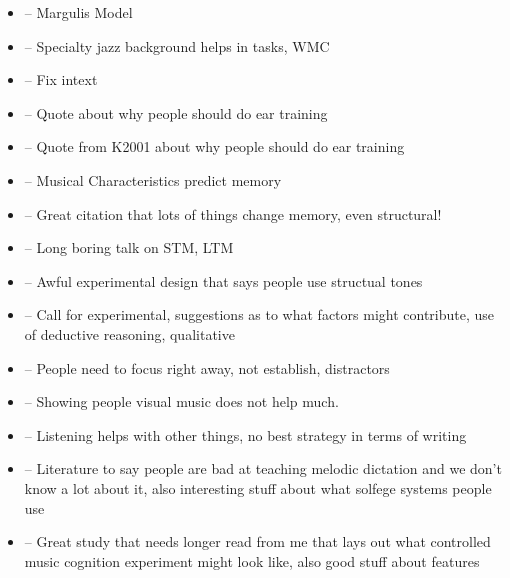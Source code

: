 \documentclass[]{book}
\providecommand{\tightlist}{%
  \setlength{\itemsep}{0pt}\setlength{\parskip}{0pt}}
\theoremstyle{definition}
\theoremstyle{definition}
\theoremstyle{definition}
\theoremstyle{remark}
\begin{document}
\begin{itemize}
\tightlist
\item
  \citep{margulisModelMelodicExpectation2005} -- Margulis Model
\item
  \citep{nicholsScoreOneJazz2018} -- Specialty jazz background helps in
  tasks, WMC
\item
  \citep{NASM201718HandbookPdf2018} -- Fix intext
\item
  \citep{schumann1860musikalische} -- Quote about why people should do
  ear training
\item
  \citep{smith1934solfege} -- Quote from K2001 about why people should
  do ear training
\item
  \citep{longRelationshipsPitchMemory1977} -- Musical Characteristics
  predict memory
\item
  \citep{taylorStrategiesMemoryShort1983} -- Great citation that lots of
  things change memory, even structural!
\item
  \citep{tallaricoStudyThreePhase1974} -- Long boring talk on STM, LTM
\item
  \citep{ouraConstructingRepresentationMelody1991a} -- Awful
  experimental design that says people use structual tones
\item
  \citep{buonviriExplorationUndergraduateMusic2014} -- Call for
  experimental, suggestions as to what factors might contribute, use of
  deductive reasoning, qualitative
\item
  \citep{buonviriEffectsPreparatorySinging2015} -- People need to focus
  right away, not establish, distractors
\item
  \citep{buonviriEffectsMusicNotation2015} -- Showing people visual
  music does not help much.
\item
  \citep{buonviriEffectsTwoListening2017} -- Listening helps with other
  things, no best strategy in terms of writing
\item
  \citep{buonviriMelodicDictationInstruction2015} -- Literature to say
  people are bad at teaching melodic dictation and we don't know a lot
  about it, also interesting stuff about what solfege systems people use
\item
  \citep{pembrookInterferenceTranscriptionProcess24} -- Great study that
  needs longer read from me that lays out what controlled music
  cognition experiment might look like, also good stuff about features
\end{itemize}


\end{document}
